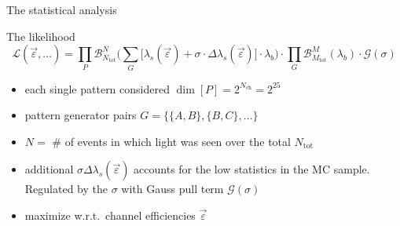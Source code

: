 \documentclass[10pt,aspectratio=169]{beamer}
\renewcommand{\epsilon}{\varepsilon}
\begin{document}
\begin{frame}{The statistical analysis}
  \begin{exampleblock}{The likelihood}
  \[
    \mathcal{L}(\vec{\epsilon}, \ldots) =
      \prod_P \mathcal{B}_{N_\text{tot}}^N \Big(
        \sum_G \big[ \lambda_s(\vec{\epsilon}) + \sigma \cdot
        \Delta\lambda_s(\vec{\epsilon})\big] \cdot \lambda_b
      \Big)
      \cdot \prod_G \mathcal{B}_{M_\text{tot}}^M (\lambda_b) \cdot
      \mathcal{G}(\sigma)
  \]
  \end{exampleblock}
  \begin{itemize}
    \item each single pattern considered $\dim{[P]} = 2^{N_\text{ch}} = 2^{25}$
    \item pattern generator pairs $G = \{\{A,B\},\{B,C\},\ldots\}$
    \item $N = $ \# of events in which light was seen over the total $N_\text{tot}$
    \item additional $\sigma \Delta\lambda_s(\vec{\epsilon})$ accounts for the low statistics in the MC sample. Regulated by the $\sigma$ with Gauss pull term $\mathcal{G}(\sigma)$
    \item maximize w.r.t.~channel efficiencies $\vec{\epsilon}$
  \end{itemize}
\end{frame}
\end{document}
